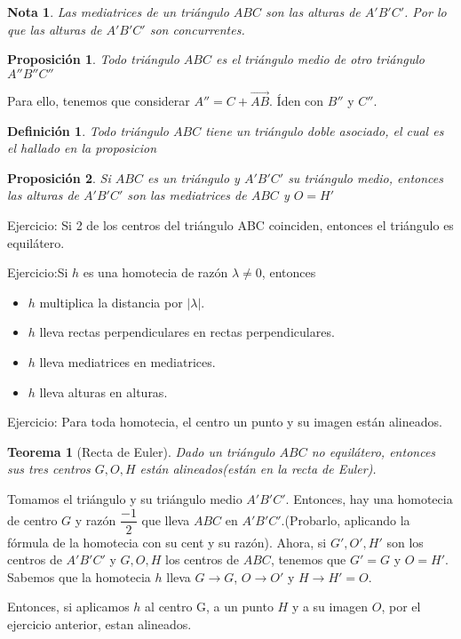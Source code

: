 \documentclass[11pt, a4paper, titlepage]{article}
\makeatletter
\renewenvironment{proof}[1][\proofname] {\vspace{-15pt}\par\pushQED{\qed}\normalfont\topsep6\p@\@plus6\p@\relax\trivlist\item[\hskip\labelsep\it#1\@addpunct{.}]\ignorespaces}{\popQED\endtrivlist\@endpefalse}
\theoremstyle{theorem-style}
\newtheorem*{nth}{Teorema}
\newtheorem*{nprop}{Proposición}
\theoremstyle{definition-style}
\newtheorem*{ndef}{Definición}
\theoremstyle{remark-style}
\newtheorem*{nota}{Nota}
\theoremstyle{example-style}
\makeatother
\begin{document}
\begin{nota}
	Las mediatrices de un triángulo $ABC$ son las alturas de $A'B'C'$. Por lo que las alturas de $A'B'C'$ son concurrentes.
\end{nota}

\begin{nprop}
	Todo triángulo $ABC$ es el triángulo medio de otro triángulo $A''B''C''$
\end{nprop}
\begin{proof}
	Para ello, tenemos que considerar $A'' = C+ \vec{AB}$. Íden con $B''$ y $C''$.
\end{proof}
\begin{ndef}
	Todo triángulo $ABC$ tiene un triángulo doble asociado, el cual es el hallado en la proposicion 
\end{ndef}


\begin{nprop}
	Si $ABC$ es un triángulo y $A'B'C'$ su triángulo medio, entonces las alturas de $A'B'C'$ son las mediatrices de $ABC$ y $O=H'$
\end{nprop}

Ejercicio: Si 2 de los centros del triángulo ABC coinciden, entonces el triángulo es equilátero.


Ejercicio:Si $h$ es una homotecia de razón $\lambda\ne 0$, entonces 
\begin{itemize}
	\item $h$ multiplica la distancia por $|\lambda|$.
	\item $h$ lleva rectas perpendiculares en rectas perpendiculares.
	\item $h$ lleva mediatrices en mediatrices.
	\item $h$ lleva alturas en alturas.
\end{itemize}

Ejercicio: Para toda homotecia, el centro un punto y su imagen están alineados.


\begin{nth}[Recta de Euler]
	Dado un triángulo $ABC$ no equilátero, entonces sus tres centros $G,O,H$ están alineados(están en la recta de Euler).
\end{nth}
\begin{proof}
	Tomamos el triángulo y su triángulo medio $A'B'C'$. Entonces, hay una homotecia de centro $G$ y razón $\dfrac{-1}{2}$ que lleva $ABC$ en $A'B'C'$.(Probarlo, aplicando la fórmula de la homotecia con su cent y su razón). 
	Ahora, si $G',O',H'$ son los centros de $A'B'C'$ y $G,O,H$ los centros de $ABC$, tenemos que $G'=G$ y $O=H'$. Sabemos que la homotecia $h$ lleva $G \to G$, $O \to O'$ y $H \to H' = O$.
	
	Entonces, si aplicamos $h$ al centro G, a un punto $H$ y a su imagen $O$, por el ejercicio anterior, estan alineados.
	
\end{proof}
\end{document}

